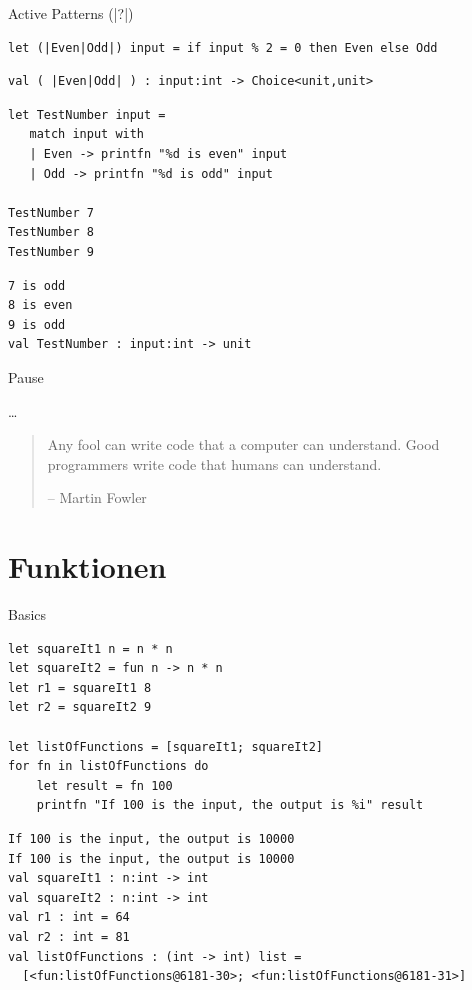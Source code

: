 \documentclass[t]{beamer}
\begin{document}
\begin{frame}[label={sec:org09d84b3},fragile]{Active Patterns (|?|)}
 \scriptsize
\begin{verbatim}
let (|Even|Odd|) input = if input % 2 = 0 then Even else Odd
\end{verbatim}

\begin{verbatim}
val ( |Even|Odd| ) : input:int -> Choice<unit,unit>
\end{verbatim}


\begin{verbatim}
let TestNumber input =
   match input with
   | Even -> printfn "%d is even" input
   | Odd -> printfn "%d is odd" input

TestNumber 7
TestNumber 8
TestNumber 9
\end{verbatim}

\begin{verbatim}
7 is odd
8 is even
9 is odd
val TestNumber : input:int -> unit
\end{verbatim}
\end{frame}

\begin{frame}[label={sec:orgdfe9053}]{Pause}
\begin{block}{\ldots{}}
\begin{quote}
Any fool can write code that a computer can understand. 
Good programmers write code that humans can understand.

\null\hfill-- Martin Fowler
\end{quote}
\end{block}
\end{frame}

\section{Funktionen }
\label{sec:orgb8fe0e6}

\begin{frame}[label={sec:org35808f9},fragile]{Basics}
 \begin{verbatim}
let squareIt1 n = n * n
let squareIt2 = fun n -> n * n
let r1 = squareIt1 8
let r2 = squareIt2 9

let listOfFunctions = [squareIt1; squareIt2]
for fn in listOfFunctions do
    let result = fn 100
    printfn "If 100 is the input, the output is %i" result
\end{verbatim}

\begin{verbatim}
If 100 is the input, the output is 10000
If 100 is the input, the output is 10000
val squareIt1 : n:int -> int
val squareIt2 : n:int -> int
val r1 : int = 64
val r2 : int = 81
val listOfFunctions : (int -> int) list =
  [<fun:listOfFunctions@6181-30>; <fun:listOfFunctions@6181-31>]
\end{verbatim}
\end{frame}
\end{document}
